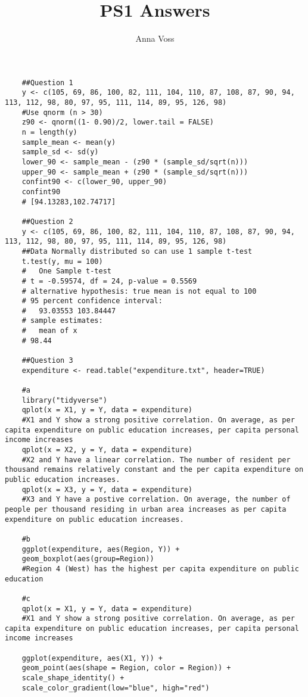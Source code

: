 \documentclass{article}
\begin{document}
	\title{PS1 Answers}
	\author{Anna Voss}
	\maketitle
	\begin{lstlisting}
	##Question 1
	y <- c(105, 69, 86, 100, 82, 111, 104, 110, 87, 108, 87, 90, 94, 113, 112, 98, 80, 97, 95, 111, 114, 89, 95, 126, 98)
	#Use qnorm (n > 30)
	z90 <- qnorm((1- 0.90)/2, lower.tail = FALSE)
	n = length(y)
	sample_mean <- mean(y)
	sample_sd <- sd(y)
	lower_90 <- sample_mean - (z90 * (sample_sd/sqrt(n)))
	upper_90 <- sample_mean + (z90 * (sample_sd/sqrt(n))) 
	confint90 <- c(lower_90, upper_90)
	confint90
	# [94.13283,102.74717]
	
	##Question 2 
	y <- c(105, 69, 86, 100, 82, 111, 104, 110, 87, 108, 87, 90, 94, 113, 112, 98, 80, 97, 95, 111, 114, 89, 95, 126, 98) 
	##Data Normally distributed so can use 1 sample t-test 
	t.test(y, mu = 100)
	# 	One Sample t-test
	# t = -0.59574, df = 24, p-value = 0.5569
	# alternative hypothesis: true mean is not equal to 100
	# 95 percent confidence interval:
	#   93.03553 103.84447
	# sample estimates:
	#   mean of x 
	# 98.44 
	
	##Question 3 
	expenditure <- read.table("expenditure.txt", header=TRUE) 
	
	#a
	library("tidyverse")
	qplot(x = X1, y = Y, data = expenditure)
	#X1 and Y show a strong positive correlation. On average, as per capita expenditure on public education increases, per capita personal income increases
	qplot(x = X2, y = Y, data = expenditure)
	#X2 and Y have a linear correlation. The number of resident per thousand remains relatively constant and the per capita expenditure on public education increases.
	qplot(x = X3, y = Y, data = expenditure)
	#X3 and Y have a postive correlation. On average, the number of people per thousand residing in urban area increases as per capita expenditure on public education increases.
	
	#b
	ggplot(expenditure, aes(Region, Y)) + 
	geom_boxplot(aes(group=Region))
	#Region 4 (West) has the highest per capita expenditure on public education 
	
	#c 
	qplot(x = X1, y = Y, data = expenditure)
	#X1 and Y show a strong positive correlation. On average, as per capita expenditure on public education increases, per capita personal income increases
	
	ggplot(expenditure, aes(X1, Y)) +
	geom_point(aes(shape = Region, color = Region)) + 
	scale_shape_identity() + 
	scale_color_gradient(low="blue", high="red")
	\end{lstlisting}
\end{document}
